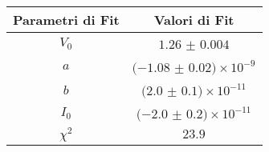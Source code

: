 \begin{tabular}{cc}
\hline
	Parametri di Fit & Valori di Fit\\ 
\hline
	$V_0$ & $1.26$ $\pm$ $0.004$ \\
	$a$ & $(-1.08$ $\pm$ $0.02)\times 10^{-9}$ \\
	$b$ & $(2.0$ $\pm$ $0.1)\times 10^{-11}$ \\
	$I_0$ & $(-2.0$ $\pm$ $0.2)\times 10^{-11}$ \\
	$\chi^2$ & $23.9$ \\
\hline
\end{tabular}
